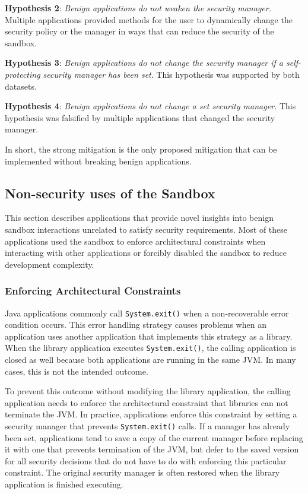\documentclass{sig-alternate}
\begin{document}
\textbf{Hypothesis 2}: \emph{Benign applications do not weaken the
security manager.} Multiple applications provided methods for the user to dynamically change the security policy or the manager in ways that can reduce the security of the sandbox.

\textbf{Hypothesis 3}: \emph{Benign applications do not change the
security manager if a self-protecting security manager has been set}.
This hypothesis was supported by both datasets.

\textbf{Hypothesis 4}: \emph{Benign applications do not change a
set security manager.} This hypothesis was falsified by multiple applications that changed the security manager.

In short, the strong mitigation is the only proposed mitigation that
can be implemented without breaking benign applications.

\subsection{Non-security uses of the Sandbox}\label{sub:Non-security-uses-of}

This section describes applications that provide novel insights into benign sandbox interactions unrelated to satisfy security
requirements. Most of these applications used the
sandbox to enforce architectural constraints when interacting with
other applications or forcibly disabled the sandbox to reduce development
complexity.

\subsubsection{Enforcing Architectural Constraints}

Java applications commonly call \texttt{System.exit()} when a non-recoverable
error condition occurs. This error handling strategy causes problems
when an application uses another application that implements this
strategy as a library. When the library application executes \texttt{System.exit()},
the calling application is closed as well because both applications
are running in the same JVM. In many cases, this is not the intended
outcome. 

To prevent this outcome without modifying the library application,
the calling application needs to enforce the architectural constraint
that libraries can not terminate the JVM. In practice, applications
enforce this constraint by setting a security manager
that prevents \texttt{System.exit()} calls. If a manager has already
been set, applications tend to save a copy of the current manager
before replacing it with one that prevents termination of the JVM,
but defer to the saved version for all security decisions that do
not have to do with enforcing this particular constraint. The original
security manager is often restored when the library application is
finished executing.
\end{document}

